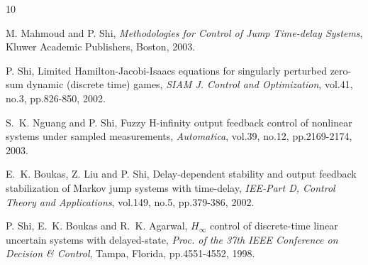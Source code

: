 \documentclass[12pt,a4paper]{icicel}
\begin{document}
\begin {thebibliography}{10}

M. Mahmoud and P. Shi, {\em Methodologies for Control of Jump Time-delay Systems},
Kluwer Academic Publishers, Boston, 2003.

P. Shi, Limited Hamilton-Jacobi-Isaacs equations for singularly perturbed zero-sum dynamic (discrete time) games,
{\em SIAM J. Control and Optimization}, vol.41, no.3, pp.826-850, 2002.

S.~K. Nguang and P. Shi, Fuzzy H-infinity output feedback control of nonlinear systems under sampled measurements,
{\em Automatica}, vol.39, no.12, pp.2169-2174, 2003.

E.~K. Boukas, Z. Liu and P. Shi, Delay-dependent stability and output feedback stabilization of Markov jump
systems with time-delay, {\em IEE-Part D, Control Theory and Applications}, vol.149, no.5, pp.379-386, 2002.

P. Shi, E.~K. Boukas and R.~K. Agarwal,
${H}_{\infty}$ control of discrete-time linear uncertain systems with delayed-state,
{\em Proc. of the 37th IEEE Conference on Decision \& Control}, Tampa, Florida, pp.4551-4552, 1998.

\end{thebibliography}
\end{document}
